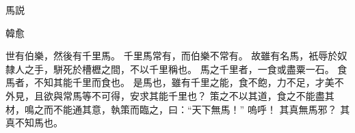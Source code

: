 馬説

韓愈

世有伯樂，然後有千里馬。
千里馬常有，而伯樂不常有。
故雖有名馬，衹辱於奴隸人之手，駢死於槽櫪之間，不以千里稱也。
馬之千里者，一食或盡粟一石。
食馬者，不知其能千里而食也。
是馬也，雖有千里之能，食不飽，力不足，才美不外見，且欲與常馬等不可得，安求其能千里也？
策之不以其道，食之不能盡其材，鳴之而不能通其意，執策而臨之，曰：“天下無馬！”
嗚呼！
其真無馬邪？
其真不知馬也。